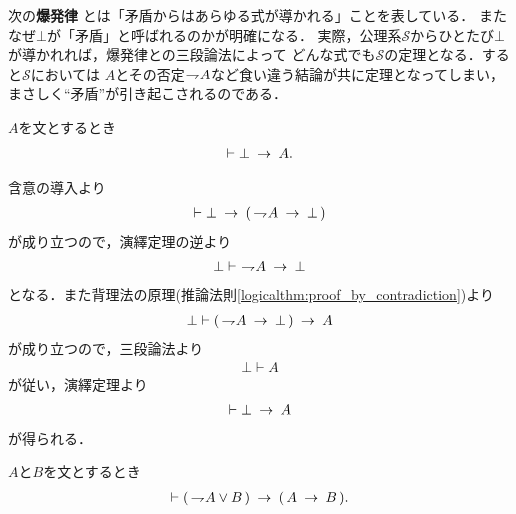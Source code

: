 	次の{\bf 爆発律}
	とは「矛盾からはあらゆる式が導かれる」ことを表している．
	またなぜ$\bot$が「矛盾」と呼ばれるのかが明確になる．
	実際，公理系$\mathscr{S}$からひとたび$\bot$が導かれれば，爆発律との三段論法によって
	どんな式でも$\mathscr{S}$の定理となる．すると$\mathscr{S}$においては
	$A$とその否定$\rightharpoondown\hspace{-0.25em} A$など食い違う結論が共に定理となってしまい，
	まさしく``矛盾''が引き起こされるのである．
	
	\begin{screen}
		\begin{logicalthm}[爆発律]
		\label{logicalthm:principle_of_explosion}
			$A$を文とするとき
			\begin{align}
				\vdash \bot \hspace{0.25em}\rightarrow\hspace{0.25em} A.
			\end{align}
		\end{logicalthm}
	\end{screen}
	
	\begin{prf}
		含意の導入より
		\begin{align}
			\vdash \bot \hspace{0.25em}\rightarrow\hspace{0.25em} (\, \rightharpoondown\hspace{-0.25em} A \hspace{0.25em}\rightarrow\hspace{0.25em} \bot\, )
		\end{align}
		が成り立つので，演繹定理の逆より
		\begin{align}
			\bot \vdash\ \rightharpoondown\hspace{-0.25em} A \hspace{0.25em}\rightarrow\hspace{0.25em} \bot
		\end{align}
		となる．また背理法の原理(推論法則\ref{logicalthm:proof_by_contradiction})より
		\begin{align}
			\bot \vdash (\, \rightharpoondown\hspace{-0.25em} A \hspace{0.25em}\rightarrow\hspace{0.25em} \bot\, ) \hspace{0.25em}\rightarrow\hspace{0.25em} A
		\end{align}
		が成り立つので，三段論法より
		\begin{align}
			\bot \vdash A
		\end{align}
		が従い，演繹定理より
		\begin{align}
			\vdash \bot \hspace{0.25em}\rightarrow\hspace{0.25em} A
		\end{align}
		が得られる．
		\QED
	\end{prf}
	
	\begin{screen}
		\begin{logicalthm}[否定の論理和は含意で書ける]
		\label{logicalthm:disjunction_of_negation_rewritable_by_implication}
			$A$と$B$を文とするとき
			\begin{align}
				\vdash (\, \rightharpoondown\hspace{-0.25em} A \vee B\, ) \hspace{0.25em}\rightarrow\hspace{0.25em} (\, A \hspace{0.25em}\rightarrow\hspace{0.25em} B\, ).
			\end{align}
		\end{logicalthm}
	\end{screen}
	
